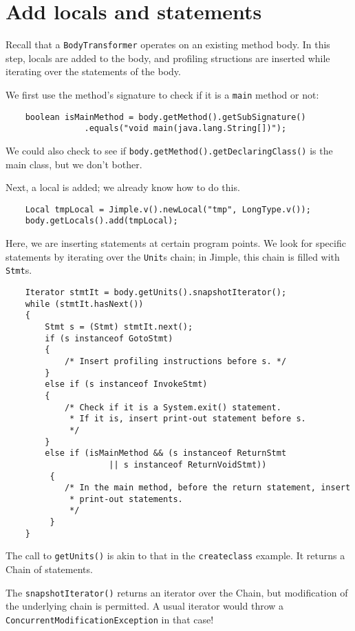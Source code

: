 \documentclass{article}
\begin{document}
\section{Add locals and statements}

Recall that a {\tt BodyTransformer} operates on an existing method
body.  In this step, locals are added to the body, and profiling structions
are inserted while iterating over the statements of the body. 

We first use the method's signature to check if it is a {\tt main}
method or not:
\begin{verbatim}
    boolean isMainMethod = body.getMethod().getSubSignature()
                .equals("void main(java.lang.String[])");
\end{verbatim}
We could also check to see if {\tt body.getMethod().getDeclaringClass()}
is the main class, but we don't bother.

Next, a local is added; we already know how to do this.
\begin{verbatim}
    Local tmpLocal = Jimple.v().newLocal("tmp", LongType.v());
    body.getLocals().add(tmpLocal);
\end{verbatim}

Here, we are inserting statements at certain program
points.  We look for specific statements by iterating over the
{\tt Unit}s chain; in Jimple, this chain is filled with {\tt Stmt}s.

\begin{verbatim}
    Iterator stmtIt = body.getUnits().snapshotIterator();
    while (stmtIt.hasNext())
    {
        Stmt s = (Stmt) stmtIt.next();
        if (s instanceof GotoStmt)
        {
            /* Insert profiling instructions before s. */
        }
        else if (s instanceof InvokeStmt)
        {
            /* Check if it is a System.exit() statement.
             * If it is, insert print-out statement before s.
             */
        }
        else if (isMainMethod && (s instanceof ReturnStmt 
                     || s instanceof ReturnVoidStmt))
         {
            /* In the main method, before the return statement, insert
             * print-out statements.
             */
         }
    }
\end{verbatim}

The call to {\tt getUnits()} is akin to that in the {\tt createclass}
example. It returns a Chain of statements. 

The {\tt snapshotIterator()} returns an iterator over the Chain,
but modification of the underlying chain is permitted.  A usual iterator
would throw a {\tt ConcurrentModificationException} in that case!
\end{document}
